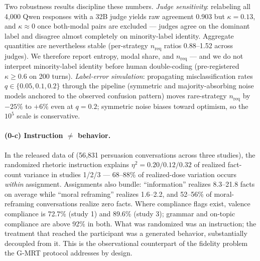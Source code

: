 \documentclass[11pt]{article}
\theoremstyle{definition}
\theoremstyle{remark}
\begin{document}
Two robustness results discipline these numbers. \emph{Judge sensitivity}:
relabeling all 4{,}000 Qwen responses with a 32B judge yields raw agreement
0.903 but $\kappa = 0.13$, and $\kappa \approx 0$ once both-modal pairs are
excluded --- judges agree on the dominant label and disagree almost
completely on minority-label identity. Aggregate quantities are nevertheless
stable (per-strategy $n_{\mathrm{req}}$ ratios 0.88--1.52 across judges). We
therefore report entropy, modal share, and $n_{\mathrm{req}}$ --- and we do
not interpret minority-label identity before human double-coding
(pre-registered $\kappa \geq 0.6$ on 200 turns). \emph{Label-error
simulation}: propagating misclassification rates $q \in \{0.05, 0.1, 0.2\}$
through the pipeline (symmetric and majority-absorbing noise models anchored
to the observed confusion pattern) moves rare-strategy $n_{\mathrm{req}}$ by
$-25\%$ to $+6\%$ even at $q = 0.2$; symmetric noise biases toward optimism,
so the $10^{5}$ scale is conservative.

\paragraph{(0-c) Instruction $\neq$ behavior.} In the released data of
\citet{hackenburg2025levers} (56{,}831 persuasion conversations across three
studies), the randomized rhetoric instruction explains $\eta^2 = 0.20 / 0.12
/ 0.32$ of realized fact-count variance in studies 1/2/3 --- 68--88\% of
realized-dose variation occurs \emph{within} assignment. Assignments also
bundle: ``information'' realizes 8.3--21.8 facts on average while ``moral
reframing'' realizes 1.6--2.2, and 52--56\% of moral-reframing conversations
realize zero facts. Where compliance flags exist, valence compliance is
72.7\% (study 1) and 89.6\% (study 3); grammar and on-topic compliance are
above 92\% in both. What was randomized was an instruction; the treatment that
reached the participant was a generated behavior, substantially decoupled
from it. This is the observational counterpart of the fidelity problem the
G-MRT protocol addresses by design.




\end{document}
